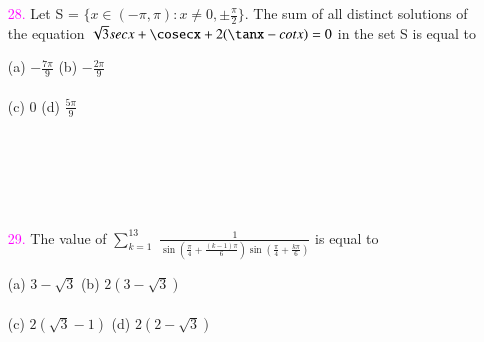 \documentclass[journal,12pt,twocolumn,article]{IEEEtran}
\theoremstyle{remark}
\begin{document}
\begin{enumerate}
\begin{flushright}
    \textcolor{magenta}{}
\end{flushright}
(a) infinitely many solutions\\
(b) three solutions\\
(c) one solution\\
(d) no solution\\\\\\
\item[\textcolor{magenta}{28.}] Let S = $\{x \in (-\pi,\pi) : x \neq 0, \pm \frac{\pi}{2}\}$. The sum of all distinct solutions of the equation $\sqrt{3}secx + \cosecx + 2(\tanx - cotx) = 0$ in the set S is equal to
\begin{flushright}
    \textcolor{magenta}{}
\end{flushright}
(a) $-\frac{7\pi}{9}$\quad
(b) $-\frac{2\pi}{9}$\\\\
(c) 0\quad
(d) $\frac{5\pi}{9}$\\\\\\\\\\\\
\item[\textcolor{magenta}{29.}] The value of $\sum_{k=1}^{13}$ $\frac{1}{\sin(\frac{\pi}{4} + \frac{(k-1)\pi}{6})\sin(\frac{\pi}{4} + \frac{k\pi}{6})}$ is equal to
\begin{flushright}
    \textcolor{magenta}{}
\end{flushright}
(a) $3-\sqrt{3}$\quad
(b) $2(3-\sqrt{3})$\\\\
(c) $2(\sqrt{3}-1)$\quad
(d) $2(2-\sqrt{3})$\\\\\\\\

\end{enumerate}
\end{document}
